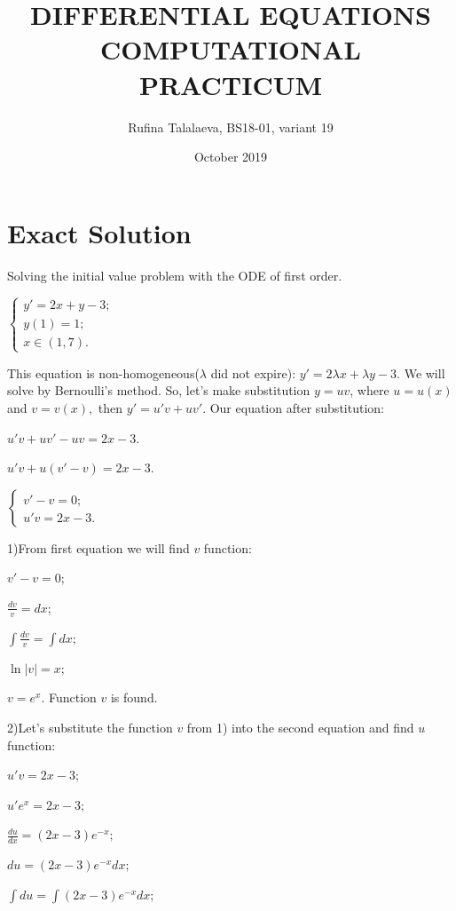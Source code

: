 \documentclass{article}
\title{\textbf{DIFFERENTIAL EQUATIONS COMPUTATIONAL PRACTICUM}}
\author{\Large{Rufina Talalaeva, BS18-01, variant 19}}
\date{October 2019}
\begin{document}
\maketitle

\section{Exact Solution}
Solving the initial value problem with the ODE of first order.

\vspace{\baselineskip}
$\left\lbrace \begin{array}{ll} y' = 2x + y - 3;\\ y(1) = 1;\\ x \in (1, 7).
\end{array}\right.$

\vspace{\baselineskip}
This equation is non-homogeneous($\lambda$ did not expire): $y' = 2\lambda  x + \lambda  y - 3.$
We will solve by Bernoulli's method. So, let's make substitution $y = uv$, where $u = u(x)$ and $v = v(x),$ then $y' = u'v + uv'.$ Our equation after substitution:

\vspace{\baselineskip}
$u'v + uv' - uv = 2x - 3.$

$u'v + u(v' - v) = 2x - 3.$

$\left\lbrace \begin{array}{ll} v' - v = 0;\\ u'v = 2x-3.\end{array}\right.$

\vspace{\baselineskip}
1)From first equation we will find $v$ function:

$v' - v = 0;$

$\frac{dv}{v} = dx;$

$\int \frac{dv}{v} = \int dx;$

$\ln {|v|} = x;$

$v = e^{x}.$ Function $v$ is found.

\vspace{\baselineskip}
2)Let's substitute the function $v$ from 1) into the second equation and find $u$ function:

$u'v = 2x-3;$

$u'e^{x} = 2x-3;$

$\frac{du}{dx} = (2x-3)e^{-x};$

$du = (2x-3)e^{-x}dx;$

$\int du = \int (2x-3)e^{-x}dx;$
\end{document}
